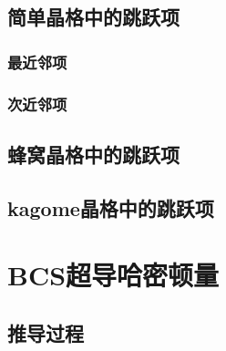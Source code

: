 \documentclass[12pt, a4paper, oneside, UTF8]{ctexbook}
\begin{document}
\section{简单晶格中的跳跃项}

\subsection{最近邻项}

\subsection{次近邻项}

\section{蜂窝晶格中的跳跃项}

\section{kagome晶格中的跳跃项}

\chapter{BCS超导哈密顿量}
\section{推导过程}
\end{document}
